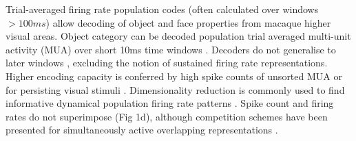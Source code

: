 \documentclass{article}
\begin{document}
Trial-averaged firing rate population codes (often calculated over windows $>100ms$) allow decoding of object \cite{hong2016explicit} and face \cite{chang2017code} properties from macaque higher visual areas. 
Object category can be decoded population trial averaged multi-unit activity (MUA) over short 10ms time windows \cite{kar2019evidence}. Decoders do not generalise to later windows \cite{kar2019evidence}, excluding the notion of sustained firing rate representations. Higher encoding capacity is conferred by high spike counts of unsorted MUA \cite{hong2016explicit, kar2019evidence} or for persisting visual stimuli \cite{hong2016explicit, chang2017code, kar2019evidence}. Dimensionality reduction is commonly used to find informative dynamical population firing rate patterns \cite{ahrens2012brain, mante2013context, cunningham2014dimensionality}.
Spike count and firing rates do not superimpose (Fig 1d), although competition schemes have been presented for simultaneously active overlapping representations \cite{bao2018representation}. 


\end{document}

